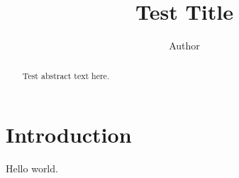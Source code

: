 \documentclass[11pt]{article}
\title{Test Title}
\author{Author}
\date{}
\begin{document}
\maketitle

\begin{abstract}
Test abstract text here.
\end{abstract}

\section{Introduction}
Hello world.
\end{document}
